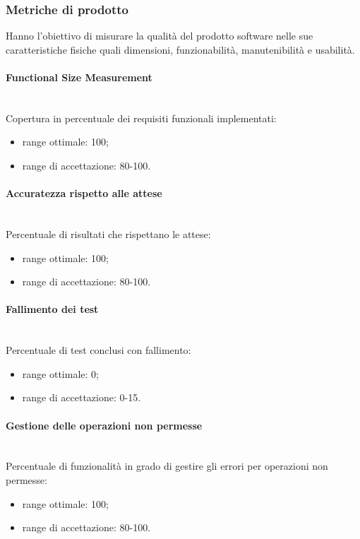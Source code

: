 \subsubsection{Metriche di prodotto}
Hanno l'obiettivo di misurare la qualità del prodotto software nelle sue caratteristiche fisiche quali dimensioni, funzionabilità, manutenibilità e usabilità.

\paragraph{Functional Size Measurement}\mbox{}\\
Copertura in percentuale dei requisiti funzionali implementati:
\begin{itemize}
	\item range ottimale: 100;
	\item range di accettazione: 80-100.
\end{itemize}

\paragraph{Accuratezza rispetto alle attese}\mbox{}\\
Percentuale di risultati che rispettano le attese:
\begin{itemize}
	\item range ottimale: 100;
	\item range di accettazione: 80-100.
\end{itemize}

\paragraph{Fallimento dei test}\mbox{}\\
Percentuale di test conclusi con fallimento:
\begin{itemize}
	\item range ottimale: 0;
	\item range di accettazione: 0-15.
\end{itemize}

\paragraph{Gestione delle operazioni non permesse}\mbox{}\\
Percentuale di funzionalità in grado di gestire gli errori per operazioni non permesse:
\begin{itemize}
	\item range ottimale: 100;
	\item range di accettazione: 80-100.
\end{itemize}

